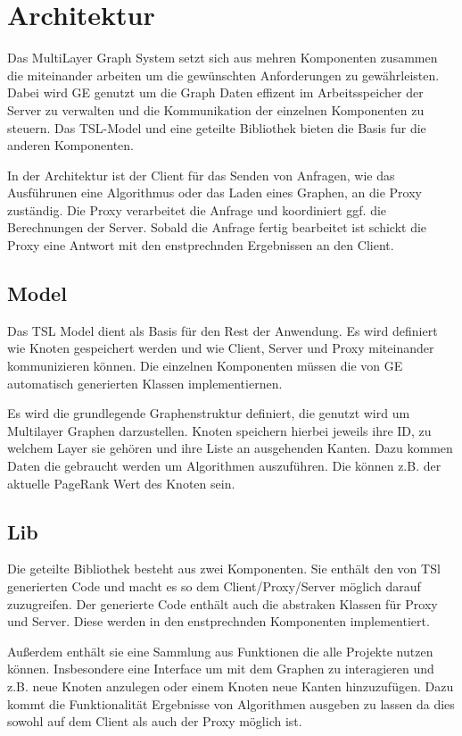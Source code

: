 
\section{Architektur}

Das MultiLayer Graph System setzt sich aus mehren Komponenten zusammen die miteinander arbeiten um die gewünschten Anforderungen zu gewährleisten.
Dabei wird GE genutzt um die Graph Daten effizent im Arbeitsspeicher der Server zu verwalten und die Kommunikation der einzelnen Komponenten zu steuern.  Das TSL-Model und eine geteilte Bibliothek bieten die Basis fur die
anderen Komponenten.

In der Architektur ist der Client für das Senden von Anfragen, wie das Ausführunen eine Algorithmus oder das Laden eines Graphen, an die Proxy zuständig.
Die Proxy verarbeitet die Anfrage und koordiniert ggf. die Berechnungen der Server. Sobald die Anfrage fertig bearbeitet ist schickt die Proxy eine Antwort mit den enstprechnden Ergebnissen an den Client.

\subsection{Model}

Das TSL Model dient als Basis für den Rest der Anwendung. Es wird definiert wie Knoten gespeichert werden und wie Client, Server und Proxy miteinander
kommunizieren können. Die einzelnen Komponenten müssen die von GE automatisch generierten Klassen implementiernen.


Es wird die grundlegende Graphenstruktur definiert, die genutzt wird um Multilayer Graphen darzustellen. Knoten speichern hierbei jeweils ihre ID, zu welchem Layer sie gehören
und ihre Liste an ausgehenden Kanten. Dazu kommen Daten die gebraucht werden um Algorithmen auszuführen. Die können z.B. der aktuelle PageRank Wert des Knoten sein.


\subsection{Lib}

Die geteilte Bibliothek besteht aus zwei Komponenten. Sie enthält den von TSl generierten Code und macht es so dem Client/Proxy/Server möglich darauf zuzugreifen. Der generierte Code enthält auch die abstraken Klassen für Proxy und Server. Diese werden in den enstprechnden Komponenten implementiert. 

Außerdem enthält sie eine Sammlung aus Funktionen die alle Projekte nutzen können. Insbesondere eine Interface um mit dem Graphen zu interagieren und z.B. neue Knoten anzulegen oder einem Knoten neue Kanten hinzuzufügen.
Dazu kommt die Funktionalität Ergebnisse von Algorithmen ausgeben zu lassen da dies sowohl auf dem Client als auch der Proxy möglich ist.


